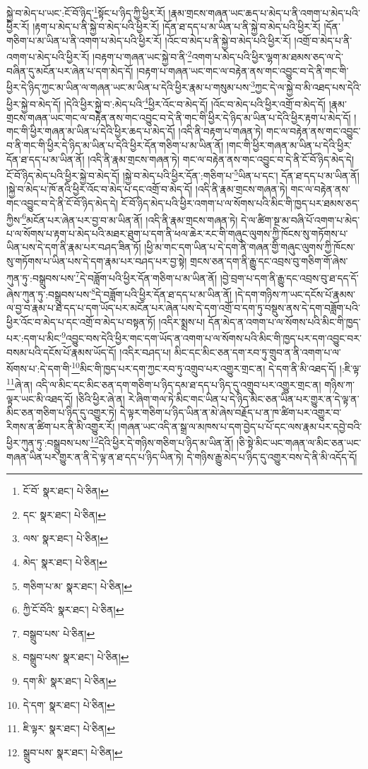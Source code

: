 སྐྱེ་བ་མེད་པ་ཡང་:ངོ་བོ་ཉིད་\footnote{ངོ་བོ་  སྣར་ཐང་།  པེ་ཅིན། }སྟོང་པ་ཉིད་ཀྱི་ཕྱིར་རོ། །རྣམ་གྲངས་གཞན་ཡང་ཆད་པ་མེད་པ་ནི་འགག་པ་མེད་པའི་ཕྱིར་རོ། །རྟག་པ་མེད་པ་ནི་སྐྱེ་བ་མེད་པའི་ཕྱིར་རོ། །དོན་ཐ་དད་པ་མ་ཡིན་པ་ནི་སྐྱེ་བ་མེད་པའི་ཕྱིར་རོ། །དོན་གཅིག་པ་མ་ཡིན་པ་ནི་འགག་པ་མེད་པའི་ཕྱིར་རོ། །འོང་བ་མེད་པ་ནི་སྐྱེ་བ་མེད་པའི་ཕྱིར་རོ། །འགྲོ་བ་མེད་པ་ནི་འགག་པ་མེད་པའི་ཕྱིར་རོ། །བརྟག་པ་གཞན་ཡང་སྐྱེ་བ་ནི་\footnote{དང་  སྣར་ཐང་།  པེ་ཅིན། }འགག་པ་མེད་པའི་ཕྱིར་ལྷག་མ་ཐམས་ཅད་ལ་དེ་བཞིན་དུ་མངོན་པར་ཞེན་པ་དག་མེད་དོ། །བརྟག་པ་གཞན་ཡང་གང་ལ་བརྟེན་ནས་གང་འབྱུང་བ་དེ་ནི་གང་གི་ཕྱིར་དེ་ཉིད་ཀྱང་མ་ཡིན་ལ་གཞན་ཡང་མ་ཡིན་པ་དེའི་ཕྱིར་རྣམ་པ་གསུམ་པས་\footnote{ལས་  སྣར་ཐང་།  པེ་ཅིན། }ཀྱང་དེ་ལ་སྐྱེ་བ་མི་འཐད་པས་དེའི་ཕྱིར་སྐྱེ་བ་མེད་དོ། །དེའི་ཕྱིར་སྐྱེ་བ་:མེད་པའི་\footnote{མེད་  སྣར་ཐང་།  པེ་ཅིན། }ཕྱིར་འོང་བ་མེད་དོ། །འོང་བ་མེད་པའི་ཕྱིར་འགྲོ་བ་མེད་དོ། །རྣམ་གྲངས་གཞན་ཡང་གང་ལ་བརྟེན་ནས་གང་འབྱུང་བ་དེ་ནི་གང་གི་ཕྱིར་དེ་ཉིད་མ་ཡིན་པ་དེའི་ཕྱིར་རྟག་པ་མེད་དོ། །གང་གི་ཕྱིར་གཞན་མ་ཡིན་པ་དེའི་ཕྱིར་ཆད་པ་མེད་དོ། །འདི་ནི་བརྟག་པ་གཞན་ཏེ། གང་ལ་བརྟེན་ནས་གང་འབྱུང་བ་ནི་གང་གི་ཕྱིར་དེ་ཉིད་མ་ཡིན་པ་དེའི་ཕྱིར་དོན་གཅིག་པ་མ་ཡིན་ནོ། །གང་གི་ཕྱིར་གཞན་མ་ཡིན་པ་དེའི་ཕྱིར་དོན་ཐ་དད་པ་མ་ཡིན་ནོ། །འདི་ནི་རྣམ་གྲངས་གཞན་ཏེ། གང་ལ་བརྟེན་ནས་གང་འབྱུང་བ་དེ་ནི་ངོ་བོ་ཉིད་མེད་དེ། ངོ་བོ་ཉིད་མེད་པའི་ཕྱིར་སྐྱེ་བ་མེད་དོ། །སྐྱེ་བ་མེད་པའི་ཕྱིར་དོན་:གཅིག་པ་\footnote{གཅིག་པ་མ་  སྣར་ཐང་།  པེ་ཅིན། }ཡིན་པ་དང་། དོན་ཐ་དད་པ་མ་ཡིན་ནོ། །སྐྱེ་བ་མེད་པ་ཁོ་ནའི་ཕྱིར་འོང་བ་མེད་པ་དང་འགྲོ་བ་མེད་དོ། །འདི་ནི་རྣམ་གྲངས་གཞན་ཏེ། གང་ལ་བརྟེན་ནས་གང་འབྱུང་བ་དེ་ནི་ངོ་བོ་ཉིད་མེད་དེ། ངོ་བོ་ཉིད་མེད་པའི་ཕྱིར་འགག་པ་ལ་སོགས་པའི་མིང་གི་ཁྱད་པར་ཐམས་ཅད་ཀྱིས་\footnote{ཀྱི་ངོ་བོའི་  སྣར་ཐང་།  པེ་ཅིན། }མངོན་པར་ཞེན་པར་བྱ་བ་མ་ཡིན་ནོ། །འདི་ནི་རྣམ་གྲངས་གཞན་ཏེ། དེ་ལ་ཚིག་སྔ་མ་བཞི་པོ་འགག་པ་མེད་པ་ལ་སོགས་པ་རྟག་པ་མེད་པའི་མཐར་ཐུག་པ་དག་ནི་ཕལ་ཆེར་རང་གི་གཞུང་ལུགས་ཀྱི་ཁོངས་སུ་གཏོགས་པ་ཡིན་པས་དེ་དག་ནི་རྣམ་པར་བཤད་ཟིན་ཏོ། །ཕྱི་མ་གང་དག་ཡིན་པ་དེ་དག་ནི་གཞན་གྱི་གཞུང་ལུགས་ཀྱི་ཁོངས་སུ་གཏོགས་པ་ཡིན་པས་དེ་དག་རྣམ་པར་བཤད་པར་བྱ་སྟེ། གྲངས་ཅན་དག་ནི་རྒྱུ་དང་འབྲས་བུ་གཅིག་གོ་ཞེས་ཀུན་ཏུ་:བསྒྲུབས་པས་\footnote{བསྒྲུབ་པས་  པེ་ཅིན། }དེ་བཟློག་པའི་ཕྱིར་དོན་གཅིག་པ་མ་ཡིན་ནོ། །བྱེ་བྲག་པ་དག་ནི་རྒྱུ་དང་འབྲས་བུ་ཐ་དད་དོ་ཞེས་ཀུན་ཏུ་:བསྒྲུབས་པས་\footnote{བསྒྲུབ་པས་  སྣར་ཐང་།  པེ་ཅིན། }དེ་བཟློག་པའི་ཕྱིར་དོན་ཐ་དད་པ་མ་ཡིན་ནོ། །དེ་དག་གཉིས་ཀ་ཡང་དངོས་པོ་རྣམས་ལ་བྱ་བ་རྣམ་པ་ཐ་དད་པ་དག་ཡོད་པར་མངོན་པར་ཞེན་པས་དེ་དག་འགྲོ་བ་དག་ཏུ་བསྡུས་ནས་དེ་དག་བཟློག་པའི་ཕྱིར་འོང་བ་མེད་པ་དང་འགྲོ་བ་མེད་པ་བསྟན་ཏོ། །འདིར་སྨྲས་པ། དོན་མེད་ན་འགག་པ་ལ་སོགས་པའི་མིང་གི་ཁྱད་པར་:དག་པ་མིང་\footnote{དག་མི་  སྣར་ཐང་།  པེ་ཅིན། }འབྱུང་བས་དེའི་ཕྱིར་གང་དག་ཡོད་ན་འགག་པ་ལ་སོགས་པའི་མིང་གི་ཁྱད་པར་དག་འབྱུང་བར་བསམ་པའི་དངོས་པོ་རྣམས་ཡོད་དོ། །འདིར་བཤད་པ། མིང་དང་མིང་ཅན་དག་རབ་ཏུ་གྲུབ་ན་ནི་འགག་པ་ལ་སོགས་པ་:དེ་དག་གི་\footnote{དེ་དག་  སྣར་ཐང་།  པེ་ཅིན། }མིང་གི་ཁྱད་པར་དག་ཀྱང་རབ་ཏུ་འགྲུབ་པར་འགྱུར་གྲང་ན། དེ་དག་ནི་མི་འཐད་དོ། །:ཇི་ལྟ་\footnote{ཇི་ལྟར་  སྣར་ཐང་།  པེ་ཅིན། }ཞེ་ན། འདི་ལ་མིང་དང་མིང་ཅན་དག་གཅིག་པ་ཉིད་དམ་ཐ་དད་པ་ཉིད་དུ་འགྲུབ་པར་འགྱུར་གྲང་ན། གཉིས་ཀ་ལྟར་ཡང་མི་འཐད་དོ། །ཅིའི་ཕྱིར་ཞེ་ན། རེ་ཞིག་གལ་ཏེ་མིང་གང་ཡིན་པ་དེ་ཉིད་མིང་ཅན་ཡིན་པར་གྱུར་ན་དེ་ལྟ་ན་མིང་ཅན་གཅིག་པ་ཉིད་དུ་འགྱུར་ཏེ། དེ་ལྟར་གཅིག་པ་ཉིད་ཡིན་ན་མེ་ཞེས་བརྗོད་པ་ན་ཁ་ཚིག་པར་འགྱུར་བ་རིགས་ན་ཚིག་པར་ནི་མི་འགྱུར་རོ། །གཞན་ཡང་འདི་ན་སྒྲ་ལ་མཁས་པ་དག་བྱེད་པ་པོ་དང་ལས་རྣམ་པར་དབྱེ་བའི་ཕྱིར་ཀུན་ཏུ་:བསྒྲུབས་པས་\footnote{སྒྲུབ་པས་  སྣར་ཐང་།  པེ་ཅིན། }དེའི་ཕྱིར་དེ་གཉིས་གཅིག་པ་ཉིད་མ་ཡིན་ནོ། །ཅི་སྟེ་མིང་ཡང་གཞན་ལ་མིང་ཅན་ཡང་གཞན་ཡིན་པར་གྱུར་ན་ནི་དེ་ལྟ་ན་ཐ་དད་པ་ཉིད་ཡིན་ཏེ། དེ་གཉིས་རྒྱུ་མེད་པ་ཉིད་དུ་འགྱུར་བས་དེ་ནི་མི་འདོད་དོ། 